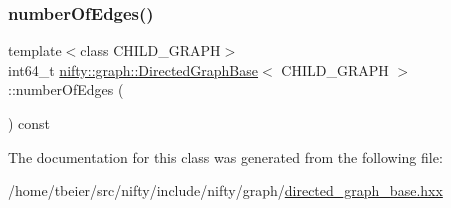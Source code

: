 \subsubsection{\texorpdfstring{number\+Of\+Edges()}{numberOfEdges()}}
{\footnotesize\ttfamily template$<$class C\+H\+I\+L\+D\+\_\+\+G\+R\+A\+PH$>$ \\
int64\+\_\+t \hyperlink{classnifty_1_1graph_1_1DirectedGraphBase}{nifty\+::graph\+::\+Directed\+Graph\+Base}$<$ C\+H\+I\+L\+D\+\_\+\+G\+R\+A\+PH $>$\+::number\+Of\+Edges (\begin{DoxyParamCaption}{ }\end{DoxyParamCaption}) const\hspace{0.3cm}{\ttfamily [inline]}}



The documentation for this class was generated from the following file\+:\begin{DoxyCompactItemize}
\item 
/home/tbeier/src/nifty/include/nifty/graph/\hyperlink{directed__graph__base_8hxx}{directed\+\_\+graph\+\_\+base.\+hxx}\end{DoxyCompactItemize}
